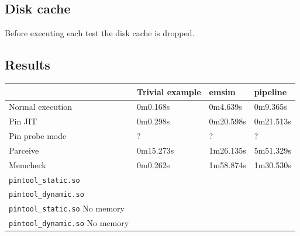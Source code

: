 \subsection{Disk cache}

Before executing each test the disk cache is dropped.

\subsection{Results}

\begin{tabular}{l|l|l|l}
	& Trivial example & emsim & pipeline \\ 
	\hline 
	Normal execution & 0m0.168s & 0m4.639s & 0m9.365s \\ 
	\hline 
	Pin JIT & 0m0.298s & 0m20.598s & 0m21.513s \\ 
	\hline 
	Pin probe mode & ? & ? & ? \\ 		
	\hline 
	Parceive & 0m15.273s & 1m26.135s & 5m51.329s \\ 
	\hline 
	Memcheck & 0m0.262s & 1m58.874s & 1m30.530s \\ 
	\hline 
	\texttt{pintool\_static.so} &  & &  \\ 
	\hline
	\texttt{pintool\_dynamic.so} &  & &  \\
	\hline
	\texttt{pintool\_static.so} No memory &  & &  \\ 
	\hline
	\texttt{pintool\_dynamic.so} No memory &  & &  \\
\end{tabular} 